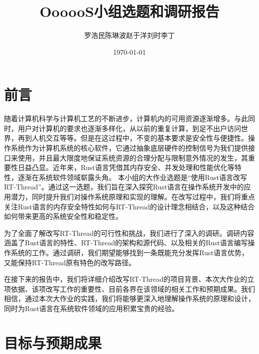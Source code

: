 \documentclass{ctexart}
\title{OooooS小组选题和调研报告}
\author{罗浩民\;陈琳波\;赵于洋\;刘时\;李丁}
\date{\today}
\begin{document}
\maketitle

\section{前言}
随着计算机科学与计算机工艺的不断进步，计算机内的可用资源逐渐增多。与此同时，用户对计算机的要求也逐渐多样化，从以前的重复计算，到足不出户访问世界，再到人机交互等等。但是在这过程中，不变的基本要求是安全性与便捷性。操作系统作为计算机系统的核心软件，它通过抽象底层硬件的控制信号为我们提供接口来使用，并且最大限度地保证系统资源的合理分配与限制意外情况的发生，其重要性日益凸显。近年来，Rust语言凭借其内存安全、并发处理和性能优化等特性，逐渐在系统软件领域崭露头角。
本小组的大作业选题是“使用Rust语言改写RT-Thread”。通过这一选题，我们旨在深入探究Rust语言在操作系统开发中的应用潜力，同时提升我们对操作系统原理和实现的理解。在改写过程中，我们将重点关注Rust语言的内存安全特性如何与RT-Thread的设计理念相结合，以及这种结合如何带来更高的系统安全性和稳定性。

为了全面了解改写RT-Thread的可行性和挑战，我们进行了深入的调研。调研内容涵盖了Rust语言的特性、RT-Thread的架构和源代码、以及相关的Rust语言编写操作系统的工作。通过调研，我们期望能够找到一条既能充分发挥Rust语言优势，又能保持RT-Thread原有特色的改写路径。

在接下来的报告中，我们将详细介绍改写RT-Thread的项目背景、本次大作业的立项依据、该项改写工作的重要性、目前各界在该领域的相关工作和预期成果。我们相信，通过本次大作业的实践，我们将能够更深入地理解操作系统的原理和设计，同时为Rust语言在系统软件领域的应用积累宝贵的经验。
\newpage
\tableofcontents
\newpage








\section{目标与预期成果}
\end{document}
